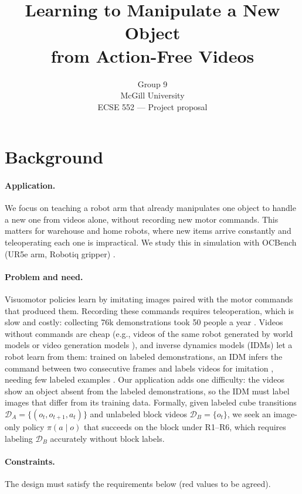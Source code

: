 \documentclass{article}
\title{Learning to Manipulate a New Object\\from Action-Free Videos}
\author{
  Group 9 \\
  McGill University \\
  ECSE 552 --- Project proposal
}
\begin{document}
\maketitle

\section*{Background}
\paragraph{Application.}
We focus on teaching a robot arm that already manipulates one object to handle a
new one from videos alone, without recording new motor commands. This matters for
warehouse and home robots, where new items arrive constantly and teleoperating
each one is impractical. We study this in simulation with OCBench (UR5e arm,
Robotiq gripper) \citep{ocbench2026}.

\paragraph{Problem and need.}
Visuomotor policies learn by imitating images paired with the motor commands that
produced them. Recording these commands requires teleoperation, which is slow and
costly: collecting 76k demonstrations took 50 people a year
\citep{khazatsky2024droid}. Videos without commands are cheap (e.g., videos of the same robot generated
by world models or video generation models \citep{jang2025dreamgen}), and inverse dynamics models (IDMs) let a
robot learn from them: trained on labeled demonstrations, an IDM infers the
command between two consecutive frames and labels videos for imitation
\citep{torabi2018bco,baker2022vpt}, needing few labeled examples
\citep{morin2026idmssil}. Our application adds one difficulty:
the videos show an object absent from the labeled demonstrations, so the IDM must
label images that differ from its training data. Formally, given labeled cube transitions
$\mathcal{D}_A=\{(o_t,o_{t+1},a_t)\}$ and unlabeled block videos
$\mathcal{D}_B=\{o_t\}$, we seek an image-only policy $\pi(a \mid o)$ that
succeeds on the block under R1--R6, which requires labeling $\mathcal{D}_B$
accurately without block labels.

\paragraph{Constraints.}
The design must satisfy the requirements below (red values to be agreed).
\end{document}
